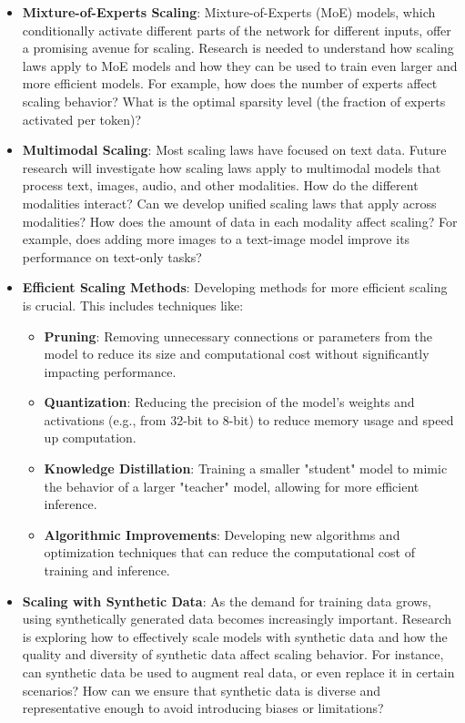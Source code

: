 \begin{itemize}
    \item \textbf{Mixture-of-Experts Scaling}:  Mixture-of-Experts (MoE) models, which conditionally activate different parts of the network for different inputs, offer a promising avenue for scaling. Research is needed to understand how scaling laws apply to MoE models and how they can be used to train even larger and more efficient models. For example, how does the number of experts affect scaling behavior? What is the optimal sparsity level (the fraction of experts activated per token)?
    \item \textbf{Multimodal Scaling}:  Most scaling laws have focused on text data. Future research will investigate how scaling laws apply to multimodal models that process text, images, audio, and other modalities. How do the different modalities interact? Can we develop unified scaling laws that apply across modalities? How does the amount of data in each modality affect scaling? For example, does adding more images to a text-image model improve its performance on text-only tasks?
    \item \textbf{Efficient Scaling Methods}:  Developing methods for more efficient scaling is crucial. This includes techniques like:
        \begin{itemize}
            \item \textbf{Pruning}:  Removing unnecessary connections or parameters from the model to reduce its size and computational cost without significantly impacting performance.
            \item \textbf{Quantization}:  Reducing the precision of the model's weights and activations (e.g., from 32-bit to 8-bit) to reduce memory usage and speed up computation.
            \item \textbf{Knowledge Distillation}:  Training a smaller "student" model to mimic the behavior of a larger "teacher" model, allowing for more efficient inference.
            \item \textbf{Algorithmic Improvements}: Developing new algorithms and optimization techniques that can reduce the computational cost of training and inference.
        \end{itemize}
    \item \textbf{Scaling with Synthetic Data}: As the demand for training data grows, using synthetically generated data becomes increasingly important. Research is exploring how to effectively scale models with synthetic data and how the quality and diversity of synthetic data affect scaling behavior. For instance, can synthetic data be used to augment real data, or even replace it in certain scenarios? How can we ensure that synthetic data is diverse and representative enough to avoid introducing biases or limitations?

\end{itemize}
